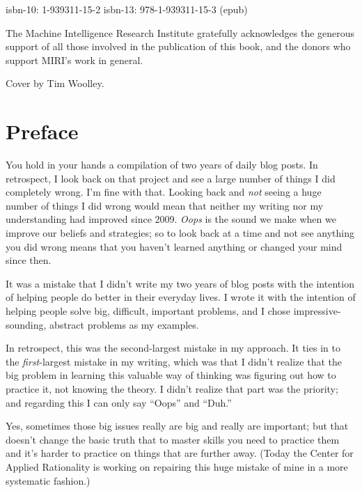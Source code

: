 \documentclass[letterpaper]{book}
\newcounter{mysection}
\newcommand{\mysectionnn}[1]{
  \section*{#1}
  \addcontentsline{toc}{section}{#1}
  \setcounter{footnote}{0}
}
\begin{document}
\bigskip

{\centering
 isbn-10: 1-939311-15-2\newline
 isbn-13: 978-1-939311-15-3\newline
 (epub)
\par}


\bigskip

{\centering
 The Machine Intelligence Research Institute gratefully
acknowledges the generous support of all those involved in the
publication of this book, and the donors who support
MIRI's work in general.
\par}

{\centering
 Cover by Tim Woolley.
\par}


\tableofcontents


\mysectionnn{Preface}

{
 You hold in your hands a compilation of two years of daily blog
posts. In retrospect, I look back on that project and see a large
number of things I did completely wrong. I'm fine with
that. Looking back and \textit{not} seeing a huge number of things I
did wrong would mean that neither my writing nor my understanding had
improved since 2009. \textit{Oops} is the sound we make when we improve
our beliefs and strategies; so to look back at a time and not see
anything you did wrong means that you haven't learned
anything or changed your mind since then.}

{
 It was a mistake that I didn't write my two years
of blog posts with the intention of helping people do better in their
everyday lives. I wrote it with the intention of helping people solve
big, difficult, important problems, and I chose impressive-sounding,
abstract problems as my examples.}

{
 In retrospect, this was the second-largest mistake in my approach.
It ties in to the \textit{first}{}-largest mistake in my writing, which
was that I didn't realize that the big problem in
learning this valuable way of thinking was figuring out how to practice
it, not knowing the theory. I didn't realize that part
was the priority; and regarding this I can only say
``Oops'' and
``Duh.''}

{
 Yes, sometimes those big issues really are big and really are
important; but that doesn't change the basic truth that
to master skills you need to practice them and it's
harder to practice on things that are further away. (Today the Center
for Applied Rationality is working on repairing this huge mistake of
mine in a more systematic fashion.)}
\end{document}
